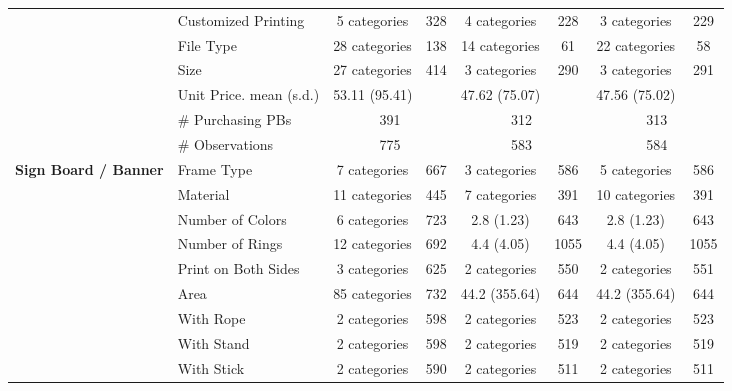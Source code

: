 \begin{longtable}{llccccccccc}
 & Customized Printing & \multicolumn{2}{c}{5 categories} & 328 & \multicolumn{2}{c}{4 categories} & 228 & \multicolumn{2}{c}{3 categories} & 229 \\* 
 & File Type & \multicolumn{2}{c}{28 categories} & 138 & \multicolumn{2}{c}{14 categories} & 61 & \multicolumn{2}{c}{22 categories} & 58 \\* 
 & Size & \multicolumn{2}{c}{27 categories} & 414 & \multicolumn{2}{c}{3 categories} & 290 & \multicolumn{2}{c}{3 categories} & 291 \\* 
 \cmidrule{2-11} 
 & Unit Price. mean (s.d.) & \multicolumn{3}{l}{53.11 (95.41)} & \multicolumn{3}{l}{47.62 (75.07)} & \multicolumn{3}{l}{47.56 (75.02)} \\* 
 & \# Purchasing PBs & \multicolumn{3}{c}{391} & \multicolumn{3}{c}{312} & \multicolumn{3}{c}{313} \\* 
 & \# Observations & \multicolumn{3}{c}{775} & \multicolumn{3}{c}{583} & \multicolumn{3}{c}{584} \\* 
 \midrule 
 \multirow{12}{*}{\textbf{Sign Board / Banner}} & Frame Type & \multicolumn{2}{c}{7 categories} & 667 & \multicolumn{2}{c}{3 categories} & 586 & \multicolumn{2}{c}{5 categories} & 586 \\* 
 & Material & \multicolumn{2}{c}{11 categories} & 445 & \multicolumn{2}{c}{7 categories} & 391 & \multicolumn{2}{c}{10 categories} & 391 \\* 
 & Number of Colors & \multicolumn{2}{c}{6 categories} & 723 & \multicolumn{2}{c}{2.8 (1.23)} & 643 & \multicolumn{2}{c}{2.8 (1.23)} & 643 \\* 
 & Number of Rings & \multicolumn{2}{c}{12 categories} & 692 & \multicolumn{2}{c}{4.4 (4.05)} & 1055 & \multicolumn{2}{c}{4.4 (4.05)} & 1055 \\* 
 & Print on Both Sides & \multicolumn{2}{c}{3 categories} & 625 & \multicolumn{2}{c}{2 categories} & 550 & \multicolumn{2}{c}{2 categories} & 551 \\* 
 & Area & \multicolumn{2}{c}{85 categories} & 732 & \multicolumn{2}{c}{44.2 (355.64)} & 644 & \multicolumn{2}{c}{44.2 (355.64)} & 644 \\* 
 & With Rope & \multicolumn{2}{c}{2 categories} & 598 & \multicolumn{2}{c}{2 categories} & 523 & \multicolumn{2}{c}{2 categories} & 523 \\* 
 & With Stand & \multicolumn{2}{c}{2 categories} & 598 & \multicolumn{2}{c}{2 categories} & 519 & \multicolumn{2}{c}{2 categories} & 519 \\* 
 & With Stick & \multicolumn{2}{c}{2 categories} & 590 & \multicolumn{2}{c}{2 categories} & 511 & \multicolumn{2}{c}{2 categories} & 511 \\* 

\end{longtable}
